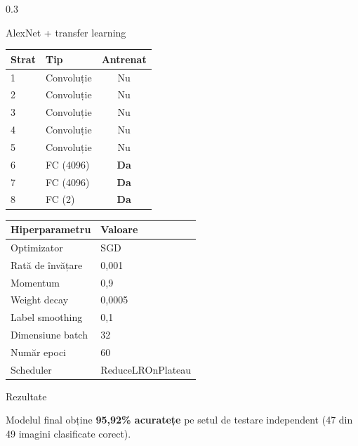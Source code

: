 \documentclass[final]{beamer}
\begin{document}
\begin{frame}[fragile]
\begin{columns}[t]
\begin{column}{0.3\paperwidth}
\begin{block}{AlexNet + transfer learning}
\smallskip

\noindent\hspace*{\fill}
\begin{minipage}{0.44\linewidth}
    \centering
    \normalsize
    \begin{tabular}{@{} llc @{}}
        \toprule
        \textbf{Strat} & \textbf{Tip} & \textbf{Antrenat} \\
        \midrule
        1 & Convoluție & Nu \\
        2 & Convoluție & Nu \\
        3 & Convoluție & Nu \\
        4 & Convoluție & Nu \\
        5 & Convoluție & Nu \\
        6 & FC (4096)  & \textbf{Da} \\
        7 & FC (4096)  & \textbf{Da} \\
        8 & FC (2)     & \textbf{Da} \\
        \bottomrule
    \end{tabular}
\end{minipage}
\hspace{0.02\linewidth}
\begin{minipage}{0.44\linewidth}
    \centering
    \normalsize
    \begin{tabular}{@{} ll @{}}
        \toprule
        \textbf{Hiperparametru} & \textbf{Valoare} \\
        \midrule
        Optimizator       & SGD \\
        Rată de învățare  & 0,001 \\
        Momentum          & 0,9 \\
        Weight decay      & 0,0005 \\
        Label smoothing   & 0,1 \\
        Dimensiune batch  & 32 \\
        Număr epoci       & 60 \\
        Scheduler         & ReduceLROnPlateau \\
        \bottomrule
    \end{tabular}
\end{minipage}
\hspace*{\fill}

\end{block}

\begin{block}{Rezultate}

Modelul final obține \textbf{95,92\% acuratețe} pe setul de testare
independent (47 din 49 imagini clasificate corect).


\end{block}
\end{column}
\end{columns}
\end{frame}
\end{document}
